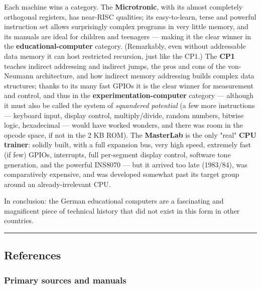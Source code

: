 \documentclass[
  11pt,
  letterpaper,
]{article}
\begin{document}
Each machine wins a category. The \textbf{Microtronic}, with its almost
completely orthogonal registers, has near-RISC qualities; its
easy-to-learn, terse and powerful instruction set allows surprisingly
complex programs in very little memory, and its manuals are ideal for
children and teenagers --- making it the clear winner in the
\textbf{educational-computer} category. (Remarkably, even without
addressable data memory it can host restricted recursion, just like the
CP1.) The \textbf{CP1} teaches indirect addressing and indirect jumps,
the pros and cons of the von-Neumann architecture, and how indirect
memory addressing builds complex data structures; thanks to its many
fast GPIOs it is the clear winner for measurement and control, and thus
in the \textbf{experimentation-computer} category --- although it must
also be called the system of \emph{squandered potential} (a few more
instructions --- keyboard input, display control, multiply/divide,
random numbers, bitwise logic, hexadecimal --- would have worked
wonders, and there was room in the opcode space, if not in the 2 KB
ROM). The \textbf{MasterLab} is the only "real" \textbf{CPU trainer}:
solidly built, with a full expansion bus, very high speed, extremely
fast (if few) GPIOs, interrupts, full per-segment display control,
software tone generation, and the powerful INS8070 --- but it arrived
too late (1983/84), was comparatively expensive, and was developed
somewhat past its target group around an already-irrelevant CPU.

In conclusion: the German educational computers are a fascinating and
magnificent piece of technical history that did not exist in this form
in other countries.

\begin{center}\rule{0.5\linewidth}{0.5pt}\end{center}

\subsection{References}\label{references}

\subsubsection{Primary sources and
manuals}\label{primary-sources-and-manuals}
\end{document}
